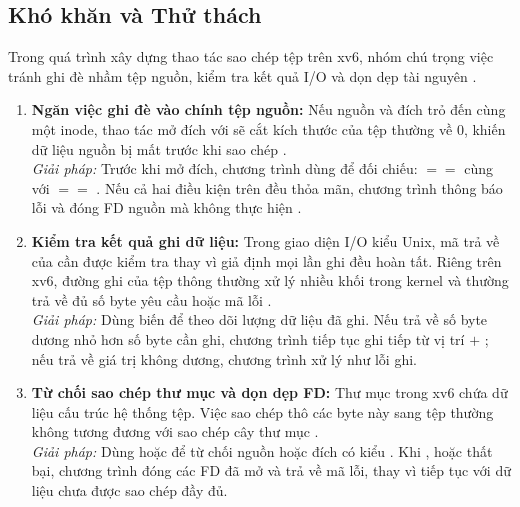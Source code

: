 \subsection{Khó khăn và Thử thách}
Trong quá trình xây dựng thao tác sao chép tệp trên xv6, nhóm
chú trọng việc tránh ghi đè nhầm tệp nguồn, kiểm tra kết quả I/O
và dọn dẹp tài nguyên \cite{xv6book}.

\begin{enumerate}[noitemsep, topsep=2pt]
    \item \textbf{Ngăn việc ghi đè vào chính tệp nguồn:}
    Nếu nguồn và đích trỏ đến cùng một inode, thao tác mở đích
    với  sẽ cắt kích thước của tệp thường về 0,
    khiến dữ liệu nguồn bị mất trước khi sao chép
    \cite{xv6sysfile}.\\
    \textit{Giải pháp:}
    Trước khi mở đích, chương trình dùng  để đối chiếu:
     $==$  cùng với
     $==$ .
    Nếu cả hai điều kiện trên đều thỏa mãn, chương trình thông báo lỗi và đóng
    FD nguồn mà không thực hiện .

    \item \textbf{Kiểm tra kết quả ghi dữ liệu:}
    Trong giao diện I/O kiểu Unix, mã trả về của  cần
    được kiểm tra thay vì giả định mọi lần ghi đều hoàn tất.
    Riêng trên xv6, đường ghi của tệp thông thường xử lý nhiều khối
    trong kernel và thường trả về đủ số byte yêu cầu hoặc mã lỗi
    \cite{xv6file}.\\
    \textit{Giải pháp:}
    Dùng biến  để theo dõi lượng dữ liệu đã ghi.
    Nếu  trả về số byte dương nhỏ hơn số byte cần ghi,
    chương trình tiếp tục ghi tiếp từ vị trí
     $+$ ; nếu trả về giá trị không dương,
    chương trình xử lý như lỗi ghi.

    \item \textbf{Từ chối sao chép thư mục và dọn dẹp FD:}
    Thư mục trong xv6 chứa dữ liệu cấu trúc hệ thống tệp.
    Việc sao chép thô các byte này sang tệp thường không tương đương
    với sao chép cây thư mục \cite{xv6book}.\\
    \textit{Giải pháp:}
    Dùng  hoặc  để từ chối nguồn hoặc đích
    có kiểu . Khi ,  hoặc
     thất bại, chương trình đóng các FD đã mở và trả về
    mã lỗi, thay vì tiếp tục với dữ liệu chưa được sao chép đầy đủ.
\end{enumerate}